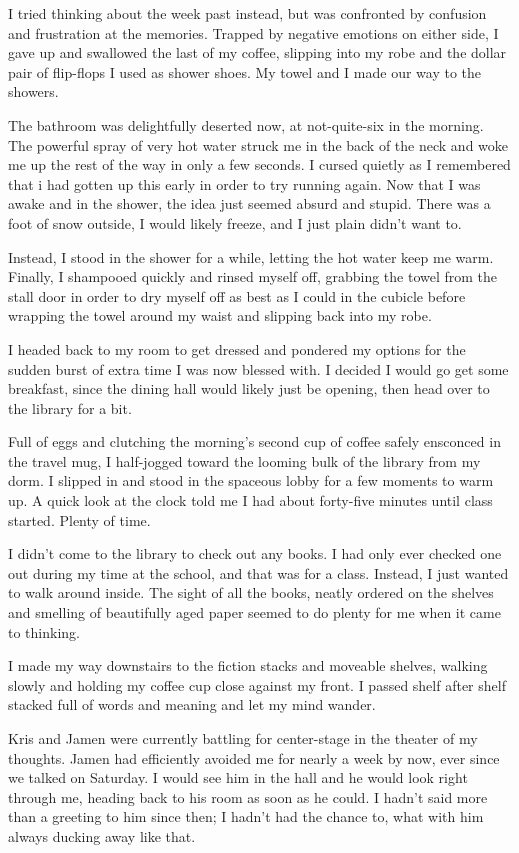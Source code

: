 I tried thinking about the week past instead, but was confronted by confusion and frustration at the memories.  Trapped by negative emotions on either side, I gave up and swallowed the last of my coffee, slipping into my robe and the dollar pair of flip-flops I used as shower shoes.  My towel and I made our way to the showers.

The bathroom was delightfully deserted now, at not-quite-six in the morning.  The powerful spray of very hot water struck me in the back of the neck and woke me up the rest of the way in only a few seconds.  I cursed quietly as I remembered that i had gotten up this early in order to try running again.  Now that I was awake and in the shower, the idea just seemed absurd and stupid.  There was a foot of snow outside, I would likely freeze, and I just plain didn't want to.

Instead, I stood in the shower for a while, letting the hot water keep me warm.  Finally, I shampooed quickly and rinsed myself off, grabbing the towel from the stall door in order to dry myself off as best as I could in the cubicle before wrapping the towel around my waist and slipping back into my robe.

I headed back to my room to get dressed and pondered my options for the sudden burst of extra time I was now blessed with.  I decided I would go get some breakfast, since the dining hall would likely just be opening, then head over to the library for a bit.

Full of eggs and clutching the morning's second cup of coffee safely ensconced in the travel mug, I half-jogged toward the looming bulk of the library from my dorm.  I slipped in and stood in the spaceous lobby for a few moments to warm up.  A quick look at the clock told me I had about forty-five minutes until class started.  Plenty of time.

I didn't come to the library to check out any books.  I had only ever checked one out during my time at the school, and that was for a class.  Instead, I just wanted to walk around inside.  The sight of all the books, neatly ordered on the shelves and smelling of beautifully aged paper seemed to do plenty for me when it came to thinking.

I made my way downstairs to the fiction stacks and moveable shelves, walking slowly and holding my coffee cup close against my front.  I passed shelf after shelf stacked full of words and meaning and let my mind wander.

Kris and Jamen were currently battling for center-stage in the theater of my thoughts.  Jamen had efficiently avoided me for nearly a week by now, ever since we talked on Saturday.  I would see him in the hall and he would look right through me, heading back to his room as soon as he could.  I hadn't said more than a greeting to him since then; I hadn't had the chance to, what with him always ducking away like that.

